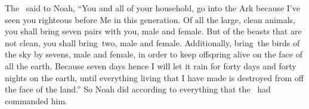 
\begin{inparaenum}
   The \lord\ said to Noah, ``You and all of your household, go into the Ark because I've seen you righteous before Me in this generation.%
   Of all the large, clean animals, you shall bring seven pairs with you, male and female. But of the beasts that are not clean, you shall bring\understood\ two, male and female.%
   Additionally, bring\understood\ the birds of the sky by sevens, male and female, in order to keep offspring alive on the face of all the earth.%
   Because seven days hence I will let it rain for forty days and forty nights on the earth, until everything living that I have made is destroyed from off the face of the land.''%
   So Noah did according to everything that the \lord\ had commanded him.%
  

\end{inparaenum}
